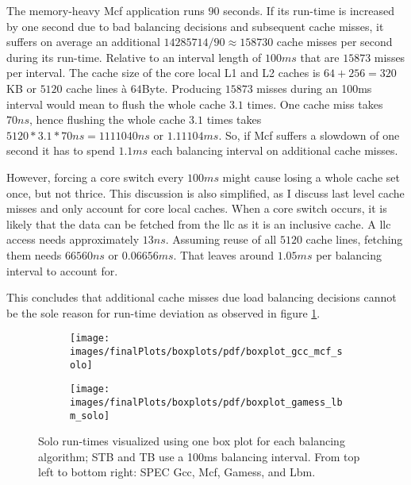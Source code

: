 The memory-heavy Mcf application runs $90$ seconds.
If its run-time is increased by one second due to bad balancing decisions and
subsequent cache misses, it suffers on average an additional
$14285714 / 90 \approx 158730$ cache misses per second during its run-time.
Relative to an interval length of $100ms$ that are $15873$ misses per interval.
The cache size of the core local L1 and L2 caches is $64 + 256 = 320$KB or
$5120$ cache lines \`a $64$Byte.
Producing $15873$ misses during an 100ms interval would mean to flush the
whole cache $3.1$ times.
One cache miss takes $70ns$, hence flushing the whole cache $3.1$ times takes
$5120 * 3.1 * 70ns = 1111040ns$ or $1.11104ms$.
So, if Mcf suffers a slowdown of one second it has to spend $1.1ms$ each balancing
interval on additional cache misses.

However, forcing a core switch every $100ms$ might cause losing a whole cache set
once, but not thrice.
This discussion is also simplified, as I discuss last level cache misses
and only account for core local caches.
When a core switch occurs, it is likely that the data can be fetched from the
\gls{llc} as it is an inclusive cache.
A \gls{llc} access needs approximately $13ns$. Assuming reuse of all $5120$ cache
lines, fetching them needs $66560ns$ or  $0.06656ms$.
That leaves around $1.05ms$ per balancing interval to account for.

This concludes that additional cache misses due load balancing decisions cannot
be the sole reason for run-time deviation as observed in figure
\ref{eval:fig:box_solo}.

\begin{figure}[!ht]
  \begin{subfigure}{\textwidth}
  \texttt{[image: images/finalPlots/boxplots/pdf/boxplot\_gcc\_mcf\_solo]}
  \end{subfigure}
  \begin{subfigure}{\textwidth}
  \texttt{[image: images/finalPlots/boxplots/pdf/boxplot\_gamess\_lbm\_solo]}
  \end{subfigure}
  \caption{Solo run-times visualized using one box plot for each balancing
    algorithm; STB and TB use a 100ms balancing interval.
    From top left to bottom right: SPEC Gcc, Mcf, Gamess, and Lbm.}
  \label{eval:fig:box_solo}
\end{figure}

